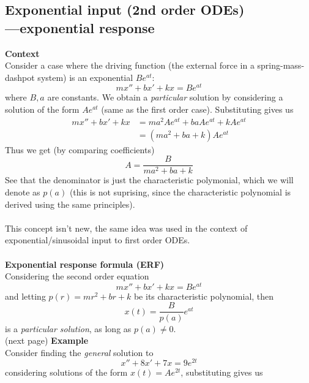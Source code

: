 \documentclass{report}
\begin{document}
\subsection{Exponential input (2nd order ODEs)\\---exponential response}
\textbf{Context}\\
Consider a case where the driving function (the external force in a spring-mass-dashpot system) is
an exponential $Be^{at}$:
\begin{equation*}
mx''+bx'+kx=Be^{at}
\end{equation*}
where $B,a$ are constants. We obtain a \textit{particular} solution by considering a solution of the form $Ae^{at}$
(same as the first order case). Substituting gives us
\begin{align*}
mx''+bx'+kx&=ma^2Ae^{at}+baAe^{at}+kAe^{at}\\
&=(ma^2+ba+k)Ae^{at}
\end{align*}
Thus we get (by comparing coefficients)
\begin{equation*}
A=\frac{B}{ma^2+ba+k}
\end{equation*}
See that the denominator is just the characteristic polymonial, which we will denote as $p(a)$ (this is not
suprising, since the characteristic polynomial is derived
using the same principles).\\
\vspace{1mm}\\
This concept isn't new, the same idea was used in the context of exponential/sinusoidal input to first order ODEs.\\
\vspace{1mm}\\
\textbf{Exponential response formula (ERF)}\\
Considering the second order equation
\begin{equation*}
mx''+bx'+kx=Be^{at}
\end{equation*}
and letting $p(r)=mr^2+br+k$ be its characteristic polynomial, then
\begin{equation*}
x(t)=\frac{B}{p(a)}e^{at}
\end{equation*}
is a \textit{particular solution}, as long as $p(a)\neq0$.\\
(next page)
\newpage
\noindent\textbf{Example}\\
Consider finding the \textit{general} solution to
\begin{equation*}
x''+8x'+7x=9e^{2t}
\end{equation*}
considering solutions of the form $x(t)=Ae^{2t}$, substituting gives us
\end{document}
